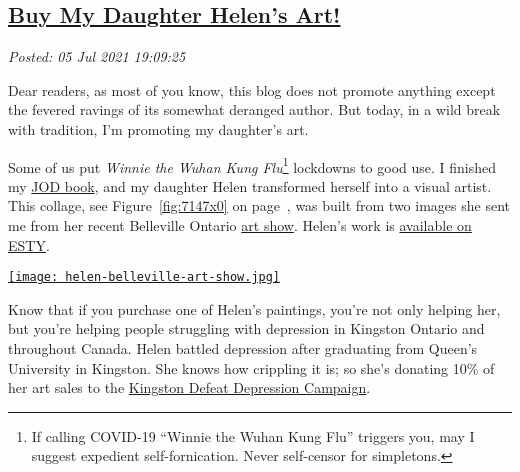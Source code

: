 %

\subsection*{\href{http://analyzethedatanotthedrivel.org/2021/07/05/buy-my-daughter-helens-art/}{Buy My Daughter Helen's Art!}}


\noindent\emph{Posted: 05 Jul 2021 19:09:25}
\vspace{6pt}

\captionsetup[figure]{labelformat=default}

Dear readers, as most of you know, this blog does not promote anything
except the fevered ravings of its somewhat deranged author. But today,
in a wild break with tradition, I'm promoting my daughter's art.

Some of us put \emph{Winnie the Wuhan Kung
Flu}\footnote{If calling COVID-19 ``Winnie the Wuhan Kung Flu'' triggers you, may I
suggest expedient self-fornication. Never self-censor for simpletons.} lockdowns to good use.
I finished my \href{https://www.amazon.com/dp/B08M2KBMND}{JOD book}, and
my daughter Helen transformed herself into a visual artist. This collage, see Figure~\ref{fig:7147x0} on page~\pageref{fig:7147x0}, 
was built from two images she sent me from her recent Belleville Ontario
\href{https://bazaarmarket.ca/}{art show}. Helen's work is
\href{https://www.etsy.com/shop/HBBArtByHelen?ref=profile_header}{available
on ESTY}.


\begin{SCfigure}[2]
\centering
\href{https://bakerjd99.files.wordpress.com/2021/07/helen-belleville-art-show.jpg}{\texttt{[image: helen-belleville-art-show.jpg]}}
\caption[A collage of my daughter's art show kiosk]{A collage of my daughter's art show kiosk and one of her paintings.
More of Helen's work is \href{https://www.etsy.com/shop/HBBArtByHelen?ref=profile_header}{available
on ESTY}.}
\label{fig:7147x0}
\end{SCfigure}


Know that if you purchase one of Helen's paintings, you're not only
helping her, but you're helping people struggling with depression in
Kingston Ontario and throughout Canada. Helen battled depression after
graduating from Queen's University in Kingston. She knows how crippling
it is; so she's donating 10\% of her art sales to the
\href{https://www.defeatdepression.ca/}{Kingston Defeat Depression
Campaign}.

